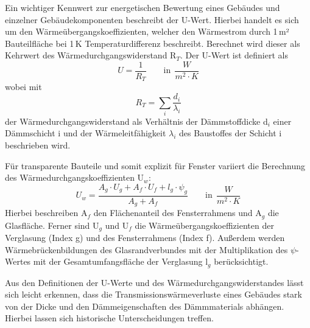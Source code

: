 Ein wichtiger Kennwert zur energetischen Bewertung eines Gebäudes und einzelner Gebäudekomponenten beschreibt der U-Wert.
Hierbei handelt es sich um den Wärmeübergangskoeffizienten, welcher den Wärmestrom durch 1\,m² Bauteilfläche bei 1\,K Temperaturdifferenz beschreibt. 
Berechnet wird dieser als Kehrwert des Wärmedurchgangswiderstand R\(_T\). 
Der U-Wert ist definiert als
\begin{equation}
\label{eq:Gleichung221}
U = \frac{1}{R_T}  \qquad \text{in} \ \ \frac{W}{m^2 \cdot K} 
\end{equation}
wobei mit
\begin{equation}
\label{eq:Gleichung222}
R_T = \sum \limits_{i} \frac{d_i}{\lambda_i}	
\end{equation}				%
der Wärmedurchgangswiderstand als Verhältnis der Dämmstoffdicke d\(_i\) einer Dämmschicht i und der Wärmeleitfähigkeit \(\lambda_i\) des Baustoffes der Schicht i beschrieben wird. 

Für transparente Bauteile und somit explizit für Fenster variiert die Berechnung des Wärmedurchgangskoeffizienten U\(_w\):
\begin{equation}
\label{eq:Gleichung223}
U_w = \frac{A_g \cdot U_g + A_f \cdot U_f + l_g \cdot \psi_g}{A_g + A_f}  \qquad \text{in} \ \ \frac{W}{m^2 \cdot K}
\end{equation}
Hierbei beschreiben A\(_f\) den Flächenanteil des Fensterrahmens und A\(_g\) die Glasfläche. Ferner sind U\(_g\) und U\(_f\) die Wärmeübergangskoeffizienten der Verglasung (Index g) und des Fensterrahmens (Index f). 
Außerdem werden Wärmebrückenbildungen des Glasrandverbundes mit der Multiplikation des \(\psi\)-Wertes mit der Gesamtumfangsfläche der Verglasung l\(_g\) berücksichtigt. \cite{Laasch.2013}

Aus den Definitionen der U-Werte und des Wärmedurchgangswiderstandes lässt sich leicht erkennen, dass die Transmissionswärmeverluste eines Gebäudes stark von der Dicke und den Dämmeigenschaften des Dämmmaterials abhängen. 
Hierbei lassen sich historische Unterscheidungen treffen.

